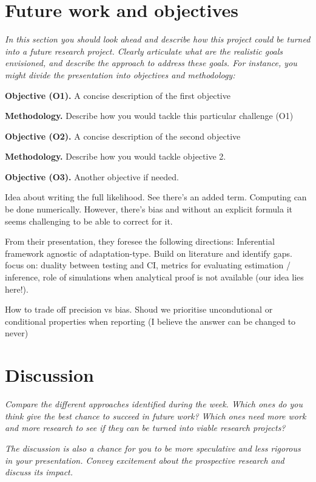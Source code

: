 \documentclass[12pt,a4paper]{article}
\begin{document}

\section{Future work and objectives}

{\itshape In this section you should look ahead and describe how this project could be
turned into a future research project. Clearly articulate what are the realistic goals envisioned, and describe the approach to address these goals. For instance, you might divide the presentation into objectives and methodology: }

{\bf Objective (O1).} A concise description of the first objective


{\bf Methodology.} Describe how you would tackle this particular challenge (O1)

{\bf Objective (O2).} A concise description of the second objective


{\bf Methodology.}  Describe how you would tackle objective 2.

{\bf Objective (O3).} Another objective if needed.

Idea about writing the full likelihood. See there's an added term. Computing can be done numerically. However, there's bias and without an explicit formula it seems challenging to be able to correct for it.

From their presentation, they foresee the following directions: Inferential framework agnostic of adaptation-type. Build on literature and identify gaps. focus on: duality between testing and CI, metrics for evaluating estimation / inference, role of simulations when analytical proof is not available (our idea lies here!).

How to trade off precision vs bias. Shoud we prioritise uncondutional or conditional properties when reporting (I believe the answer can be changed to never)

\section{Discussion}

{\itshape Compare the different approaches identified during the week. 
					Which ones do you think give the best chance to succeed in future work?
					Which ones need more work and more research to see if they can be turned into viable 
					research projects?}
					

{\itshape The discussion is also a chance for you to be more speculative and less rigorous in your presentation. Convey excitement about the prospective research and discuss its impact.}
\end{document}
